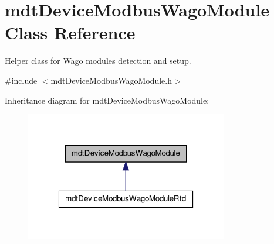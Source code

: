 \hypertarget{classmdt_device_modbus_wago_module}{
\section{mdtDeviceModbusWagoModule Class Reference}
\label{classmdt_device_modbus_wago_module}
}


Helper class for Wago modules detection and setup.  




{\ttfamily \#include $<$mdtDeviceModbusWagoModule.h$>$}



Inheritance diagram for mdtDeviceModbusWagoModule:\nopagebreak
\begin{figure}[H]
\begin{center}
\leavevmode
\includegraphics[width=250pt]{classmdt_device_modbus_wago_module__inherit__graph}
\end{center}
\end{figure}



